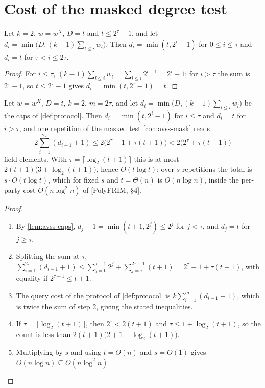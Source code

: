 \section{Cost of the masked degree test}

\begin{lemma}\label{lem:avss-caps}
Let $k=2$, $w=w^X$, $D=t$ and $t\le2^\tau-1$, and let
$d_i=\min\big(D,(k-1)\sum_{l\le i}w_l\big)$. Then $d_i=\min(t,2^i-1)$ for $0\le i\le\tau$ and
$d_i=t$ for $\tau<i\le2\tau$.
\end{lemma}

\begin{proof}
For $i\le\tau$, $(k-1)\sum_{l\le i}w_l=\sum_{l\le i}2^{l-1}=2^i-1$; for $i>\tau$ the sum is
$2^\tau-1$, so $t\le2^\tau-1$ gives $d_i=\min(t,2^\tau-1)=t$.
\end{proof}

{\renewcommand{\theproposition}{P3}
\begin{proposition}\label{prop:avss-cost}
Let $w=w^X$, $D=t$, $k=2$, $m=2\tau$, and let $d_i=\min\big(D,(k-1)\sum_{l\le i}w_l\big)$ be
the caps of \cref{def:protocol}. Then $d_i=\min(t,2^i-1)$ for $i\le\tau$ and $d_i=t$ for
$i>\tau$, and one repetition of the masked test \cref{con:avss-mask} reads
\[
2\sum_{i=1}^{2\tau}(d_{i-1}+1)\le2\big(2^\tau-1+\tau(t+1)\big)<2\big(2^\tau+\tau(t+1)\big)
\]
field elements. With $\tau=\lceil\log_2(t+1)\rceil$ this is at most
$2(t+1)\big(3+\log_2(t+1)\big)$, hence $O(t\log t)$; over $s$ repetitions the total is
$s\cdot O(t\log t)$, which for fixed $s$ and $t=\Theta(n)$ is $O(n\log n)$, inside the
per-party cost $O(n\log^2n)$ of {[PolyFRIM, \S4]}.
\end{proposition}}

\begin{proof}\begin{enumerate}
\item By \cref{lem:avss-caps}, $d_j+1=\min(t+1,2^j)\le2^j$ for $j<\tau$, and $d_j=t$ for
$j\ge\tau$.
\item Splitting the sum at $\tau$,
$\sum_{i=1}^{2\tau}(d_{i-1}+1)\le\sum_{j=0}^{\tau-1}2^j+\sum_{j=\tau}^{2\tau-1}(t+1)=2^\tau-1+\tau(t+1)$, with equality if $2^{\tau-1}\le t+1$.
\item The query cost of the protocol of \cref{def:protocol} is $k\sum_{i=1}^m(d_{i-1}+1)$, which is
twice the sum of step 2, giving the stated inequalities.
\item If $\tau=\lceil\log_2(t+1)\rceil$, then $2^\tau<2(t+1)$ and $\tau\le1+\log_2(t+1)$, so the
count is less than $2(t+1)\big(2+1+\log_2(t+1)\big)$.
\item Multiplying by $s$ and using $t=\Theta(n)$ and $s=O(1)$ gives $O(n\log n)\subseteq
O(n\log^2n)$.
\end{enumerate}\end{proof}
